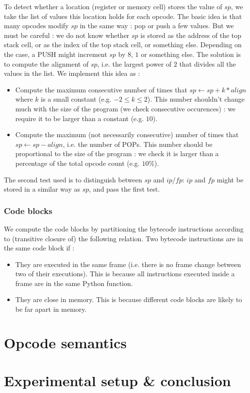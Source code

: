 \documentclass[french]{article}
\begin{document}
To detect whether a location (register or memory cell) stores the value of $sp$, we take the list of values this location holds for each opcode. The basic idea is that many opcodes modify $sp$ in the same way : pop or push a few values. But we must be careful : we do not know whether $sp$ is stored as the address of the top stack cell, or as the index of the top stack cell, or something else. Depending on the case, a PUSH might increment $sp$ by $8$, $1$ or something else. The solution is to compute the alignment of $sp$, i.e. the largest power of $2$ that divides all the values in the list. We implement this idea as :
\begin{itemize}
	\item Compute the maximum consecutive number of times that $sp \leftarrow sp + k*align$ where $k$ is a small constant (e.g. $-2 \leq k \leq 2$). This number shouldn't change much with the size of the program (we check consecutive occurences) : we require it to be larger than a constant (e.g. $10$).
	\item Compute the maximum (not necessarily consecutive) number of times that $sp \leftarrow sp - align$, i.e. the number of POPs. This number should be proportional to the size of the program : we check it is larger than a percentage of the total opcode count (e.g. $10\%$).
\end{itemize}
The second test used is to distinguish between $sp$ and $ip$/$fp$: $ip$ and $fp$ might be stored in a similar way as $sp$, and pass the first test. 

\subsubsection{Code blocks}

We compute the code blocks by partitioning the bytecode instructions according to (transitive closure of) the following relation. Two bytecode instructions are in the same code block if :
\begin{itemize}
	\item They are executed in the same frame (i.e. there is no frame change between two of their executions). This is because all instructions executed inside a frame are in the same Python function.
	\item They are close in memory. This is because different code blocks are likely to be far apart in memory. %
\end{itemize}



\section{Opcode semantics}


\section{Experimental setup \& conclusion}
\end{document}
